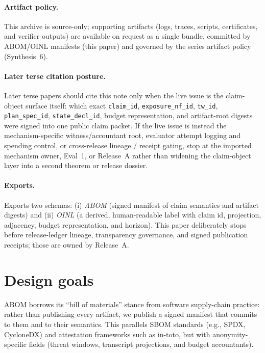 \documentclass[11pt]{article}
\begin{document}
\paragraph{Artifact policy.} This archive is source-only; supporting artifacts (logs, traces, scripts, certificates, and verifier outputs) are available on request as a single bundle, committed by ABOM/OINL manifests (this paper) and governed by the series artifact policy (Synthesis~6).\cite{series:artifactpolicy}

\paragraph{Later terse citation posture.} Later terse papers should cite this note only when the live issue is the claim-object surface itself: which exact \texttt{claim\_id}, \texttt{exposure\_nf\_id}, \texttt{tw\_id}, \texttt{plan\_spec\_id}, \texttt{state\_decl\_id}, budget representation, and artifact-root digests were signed into one public claim packet. If the live issue is instead the mechanism-specific witness/accountant root, evaluator attempt logging and spending control, or cross-release lineage / receipt gating, stop at the imported mechanism owner, Eval~1, or Release~A rather than widening the claim-object layer into a second theorem or release dossier.\cite{series:evalnotary,series:releaseproperty}

\paragraph{Exports.}
Exports two schemas: (i) \emph{ABOM} (signed manifest of claim semantics and artifact digests) and
(ii) \emph{OINL} (a derived, human-readable label with claim id, projection, adjacency, budget representation, and horizon).
This paper deliberately stops before release-ledger lineage, transparency governance, and signed publication receipts; those are owned by Release~A.\cite{series:releaseproperty}

\section{Design goals}
ABOM borrows its ``bill of materials'' stance from software supply-chain practice: rather than publishing every artifact, we publish a signed manifest that commits to them and to their semantics.
This parallels SBOM standards (e.g., SPDX, CycloneDX) and attestation frameworks such as in-toto, but with anonymity-specific fields (threat windows, transcript projections, and budget accountants).\cite{ntiaSBOM2019,spdx301,cyclonedx,intoto2019}
\end{document}
